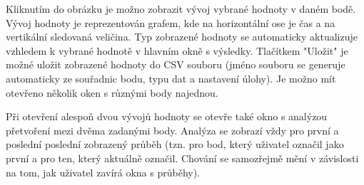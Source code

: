 \documentclass[a4paper,12pt]{article}
\begin{document}
Kliknutím do obrázku je možno zobrazit vývoj vybrané hodnoty v daném bodě. Vývoj hodnoty je reprezentován grafem, kde na horizontální ose je čas a na vertikální sledovaná veličina. Typ zobrazené hodnoty se automaticky aktualizuje vzhledem k vybrané hodnotě v hlavním okně s výsledky. Tlačítkem "Uložit" je možné uložit zobrazené hodnoty do CSV souboru (jméno souboru se generuje automaticky ze souřadnic bodu, typu dat a nastavení úlohy). Je možno mít otevřeno několik oken s různými body najednou.
\begin{figure}[H]
\end{figure}
Při otevření alespoň dvou vývojů hodnoty se otevře také okno s analýzou přetvoření mezi dvěma zadanými body. Analýza se zobrazí vždy pro první a poslední poslední zobrazený průběh (tzn. pro bod, který uživatel označil jako první a pro ten, který aktuálně označil. Chování se samozřejmě mění v závislosti na tom, jak uživatel zavírá okna s průběhy).
\newpage
\end{document}
